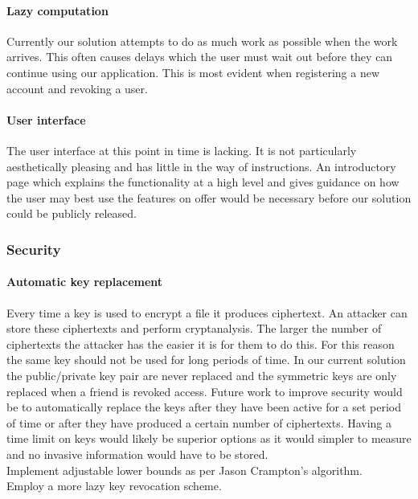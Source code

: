\documentclass[12pt, titlepage]{article}
\begin{document}
\paragraph*{Lazy computation} Currently our solution attempts to do as much work as possible when the work arrives. This often causes delays which the user must wait out before they can continue using our application. This is most evident when registering a new account and revoking a user.
\paragraph*{User interface} The user interface at this point in time is lacking. It is not particularly aesthetically pleasing and has little in the way of instructions. An introductory page which explains the functionality at a high level and gives guidance on how the user may best use the features on offer would be necessary before our solution could be publicly released.

\subsubsection*{Security}
\paragraph*{Automatic key replacement} Every time a key is used to encrypt a file it produces ciphertext. An attacker can store these ciphertexts and perform cryptanalysis. The larger the number of ciphertexts the attacker has the easier it is for them to do this. For this reason the same key should not be used for long periods of time. In our current solution the public/private key pair are never replaced and the symmetric keys are only replaced when a friend is revoked access. Future work to improve security would be to automatically replace the keys after they have been active for a set period of time or after they have produced a certain number of ciphertexts. Having a time limit on keys would likely be superior options as it would simpler to measure and no invasive information would have to be stored.
\\ Implement adjustable lower bounds as per Jason Crampton's algorithm.
\\ Employ a more lazy key revocation scheme.
\end{document}
